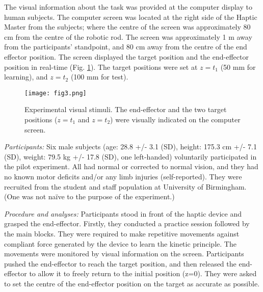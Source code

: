 The visual information about the task was provided at the computer display to human subjects. The computer screen was located at the right side of the Haptic Master from the subjects; where the centre of the screen was approximately 80 cm from the centre of the robotic rod. The screen was approximately 1 m away from the participants' standpoint, and 80 cm away from the centre of the end effector position. The screen displayed the target position and the end-effector position in real-time (Fig. \ref{stimuli}). The target positions were set at $z = t_1$ (50 mm for learning), and $z = t_2$ (100 mm for test).
%
\begin{figure}
	\centering
	\texttt{[image: fig3.png]}
	\caption{Experimental visual stimuli. The end-effector and the two target positions ($z = t_1$ and $z = t_2$) were visually indicated on the computer screen.}
	\label{stimuli}
\end{figure}


\textit{Participants:} Six male subjects (age: 28.8 +/- 3.1 (SD), height: 175.3 cm +/- 7.1 (SD), weight: 79.5 kg +/- 17.8 (SD), one left-handed) voluntarily participated in the pilot experiment. All had normal or corrected to normal vision, and they had no known motor deficits and/or any limb injuries (self-reported). They were recruited from the student and staff population at University of Birmingham. (One was not naïve to the purpose of the experiment.)


\textit{Procedure and analyses:} Participants stood in front of the haptic device and grasped the end-effector. Firstly, they conducted a practice session followed by the main blocks. They were required to make repetitive movements against compliant force generated by the device to learn the kinetic principle. The movements were monitored by visual information on the screen. Participants pushed the end-effector to reach the target position, and then released the end-effector to allow it to freely return to the initial position (z=0). They were asked to set the centre of the end-effector position on the target as accurate as possible. 

